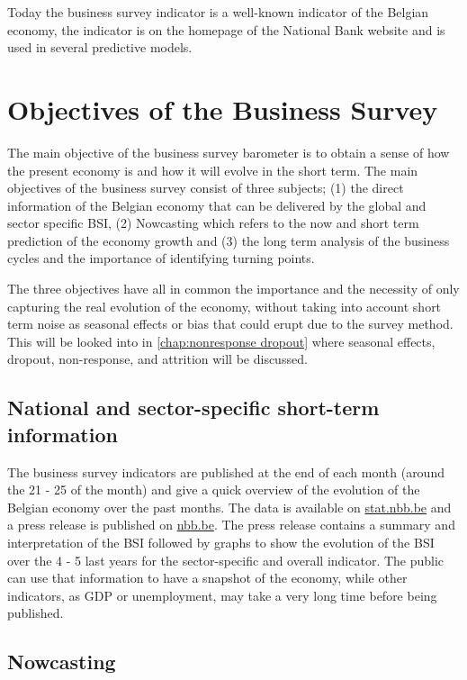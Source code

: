 \documentclass[12pt,a4paper,oneside]{book}
\begin{document}
Today the business survey indicator is a well-known indicator of the Belgian economy, the indicator is on the homepage of the National Bank website and is used in several predictive models.



\section{Objectives of the Business Survey}
\label{section:Objective}

The main objective of the business survey barometer is to obtain a sense of how the present economy is and how it will evolve in the short term.
The main objectives of the business survey consist of three subjects; (1) the direct information of the Belgian economy that can be delivered by the global and sector specific BSI, (2) Nowcasting which refers to the now and short term prediction of the economy growth and (3) the long term analysis of the business cycles and the importance of identifying turning points.

The three objectives have all in common the importance and the necessity of only capturing the real evolution of the economy, without taking into account short term noise as seasonal effects or bias that could erupt due to the survey method.
This will be looked into in \autoref{chap:nonresponse dropout} where seasonal effects, dropout, non-response, and attrition will be discussed.


\subsection{National and sector-specific short-term information}

The business survey indicators are published at the end of each month (around the 21 - 25 of the month) and give a quick overview of the evolution of the Belgian economy over the past months.
The data is available on \href{http://stat.nbb.be/Index.aspx?DataSetCode=BUSSURVM&Lang=en}{stat.nbb.be} and a press release is published on \href{http://www.nbb.be/doc/dq/e/conj.htm}{nbb.be}. 
The press release contains a summary and interpretation of the BSI followed by graphs to show the evolution of the BSI over the 4 - 5 last years for the sector-specific and overall indicator.
The public can use that information to have a snapshot of the economy, while other indicators, as GDP or unemployment, may take a very long time before being published.


\subsection{Nowcasting}
\label{sec:nowcasting}
\end{document}

